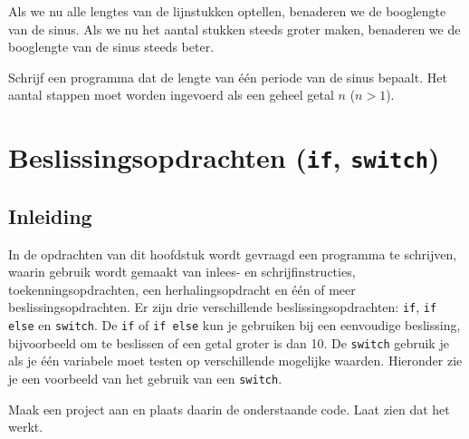 \documentclass[a4paper,10pt,fleqn,twoside]{article}
\begin{document}
\begin{figure}[H]
\centering
{}
\end{figure}

Als we nu alle lengtes van de lijnstukken optellen, benaderen we de booglengte van de sinus. Als we nu het aantal stukken steeds groter maken, benaderen we de booglengte van de sinus steeds beter.

Schrijf een programma dat de lengte van \'e\'en periode van de sinus bepaalt. Het aantal stappen moet worden ingevoerd als een geheel getal $n$ ($n>1$).


\section{Beslissingsopdrachten (\texttt{if}, \texttt{switch})}

\subsection{Inleiding}
In de opdrachten van dit hoofdstuk wordt gevraagd een programma te schrijven, waarin gebruik wordt gemaakt van inlees- en schrijfinstructies, toekenningsopdrachten, een herhalingsopdracht en één of meer beslissingsopdrachten. Er zijn drie verschillende beslissingsopdrachten: \lstinline|if|, \lstinline|if else| en \lstinline|switch|. De \lstinline|if| of \lstinline|if else| kun je gebruiken bij een eenvoudige beslissing, bijvoorbeeld om te beslissen of een getal groter is dan 10. De \lstinline|switch| gebruik je als je één variabele moet testen op verschillende mogelijke waarden. Hieronder zie je een voorbeeld van het gebruik van een \lstinline|switch|.

Maak een project aan en plaats daarin de onderstaande code. Laat zien dat het werkt.
\end{document}
